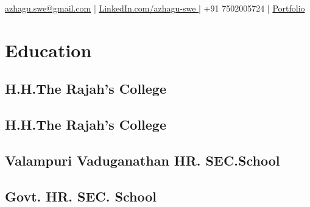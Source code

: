 \documentclass[]{azhagu-swe-resume-openfont}
\begin{document}
\lastupdated

 { 
\href{mailto:azhagu.swe@gmail.com}{azhagu.swe@gmail.com} | \href{https://www.linkedin.com/in/azhagu-swe/}{LinkedIn.com/azhagu-swe } | +91 7502005724 | \href{https://azhagu-swe.github.io/portfolio/}{Portfolio}
}


\begin{minipage}[t]{0.33\textwidth} 


\section{Education} 

\subsection{H.H.The Rajah’s College}
\sectionsep

\subsection{H.H.The Rajah’s College}
\sectionsep

\subsection{Valampuri Vaduganathan HR. SEC.School}
\sectionsep

\subsection{Govt. HR. SEC. School}
\sectionsep



\end{minipage}
\end{document}
